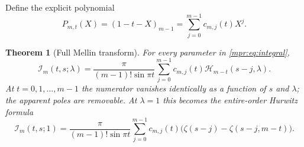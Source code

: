 \documentclass[11pt,letterpaper]{article}
\numberwithin{equation}{section}
\newtheorem{theorem}{Theorem}[section]
\theoremstyle{definition}
\theoremstyle{remark}
\begin{document}
Define the explicit polynomial
\begin{equation}\label{mpr:eq:P}
 P_{m,t}(X)=(1-t-X)_{m-1}
           =\sum_{j=0}^{m-1}c_{m,j}(t)X^j.
\end{equation}

\begin{theorem}[Full Mellin transform]\label{mpr:thm:master}
For every parameter in \eqref{mpr:eq:integral},
\begin{equation}\label{mpr:eq:master}
 \boxed{\displaystyle
 \mathcal I_m(t,s;\lambda)
 =\frac{\pi}{(m-1)!\sin\pi t}
       \sum_{j=0}^{m-1}c_{m,j}(t)
                  \mathcal H_{m-t}(s-j,\lambda).}
\end{equation}
At $t=0,1,\ldots,m-1$ the numerator vanishes identically as a function
of $s$ and $\lambda$; the apparent poles are removable.  At $\lambda=1$
this becomes the entire-order Hurwitz formula
\begin{equation}\label{mpr:eq:hurwitz}
 \mathcal I_m(t,s;1)
 =\frac{\pi}{(m-1)!\sin\pi t}
       \sum_{j=0}^{m-1}c_{m,j}(t)
       \bigl(\zeta(s-j)-\zeta(s-j,m-t)\bigr).
\end{equation}
\end{theorem}
\end{document}
